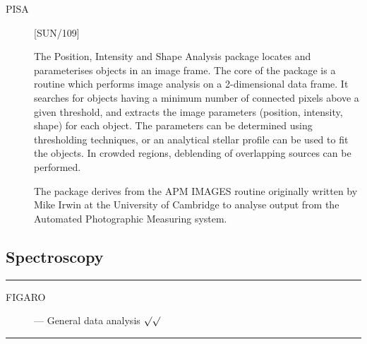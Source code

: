 \begin{description}
\item [PISA] \hfill [SUN/109]

The Position, Intensity and Shape Analysis package locates and parameterises
objects in an image frame.
The core of the package is a routine which performs image analysis on a
2-dimensional data frame.
It searches for objects having a minimum number of connected pixels above a
given threshold, and extracts the image parameters (position, intensity, shape)
for each object.
The parameters can be determined using thresholding techniques, or an analytical
stellar profile can be used to fit the objects.
In crowded regions, deblending of overlapping sources can be performed.

The package derives from the APM IMAGES routine originally written by Mike
Irwin at the University of Cambridge to analyse output from the Automated
Photographic Measuring system.

\end{description}

\newpage

\subsection{Spectroscopy}

\rule{\textwidth}{0.5mm}
\begin{description}
\begin{description}
\item [FIGARO] --- General data analysis \hfill
 $\surd\surd$
\end{description}
\end{description}
\rule{\textwidth}{0.5mm}

